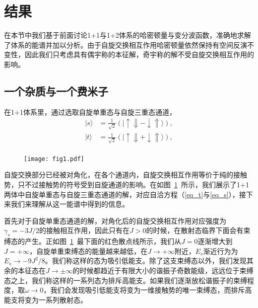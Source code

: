\section{结果}\label{2sec:spex-result}
在本节中我们基于前面讨论1+1与1+2体系的哈密顿量与变分波函数，准确地求解了体系的能谱并加以分析。由于自旋交换相互作用哈密顿量依然保持有空间反演不变性，因此我们只考虑具有偶宇称的本征解，奇宇称的解不受自旋交换相互作用的影响。

\subsection{一个杂质与一个费米子}
在1+1体系里，通过选取自旋单重态与自旋三重态通道，
\begin{equation}
\begin{split}
    |s\rangle &= \frac{1}{\sqrt{2}}(|\uparrow\Downarrow - \downarrow\Uparrow\rangle),\\
    |t\rangle &= \frac{1}{\sqrt{2}}(|\uparrow\Downarrow + \downarrow\Uparrow\rangle),\\
\end{split}
\end{equation}

\begin{figure}[!htbp]
    \centering
    \texttt{[image: fig1.pdf]}
    \label{fig:fig1}
\end{figure}

自旋交换部分已经被对角化，在各个通道内，自旋交换相互作用等价于纯的接触势，只不过接触势的符号受到自旋通道的影响。在如图~\ref{fig:fig1}~所示，我们展示了1+1两体中自旋单重态与自旋三重态通道的解，对应自洽方程（\ref{eq_t}与\ref{eq_s}），接下来我们来理解从这一能谱中得到的信息。



首先对于自旋单重态通道的解，对角化后的自旋交换相互作用对应强度为$\gamma_s=-3J/2$的接触相互作用，因此只有在$J>0$的时候，在散射态临界下面会有束缚态的产生。正如图~\ref{fig:fig1}~最下面的红色散点线所示，我们从$J=0$逐渐增大到$J=+\infty$，自旋单重束缚态的能量越来越低，在$J\to + \infty$附近，$E_s$渐近行为为$E_s\rightarrow -9J^2/8$。我们称这样的态为吸引低能支。除了这支束缚态以外，我们发现其余的本征态在$J\to \pm \infty$的时候都趋近于有限大小的谐振子奇数能级，远远位于束缚态之上，我们称这样的一系列态为排斥高能支。如果我们逐渐放松谐振子的束缚程度，取$\omega\to 0$，我们会发现吸引低能支将变为一维接触势的唯一束缚态，而排斥高能支将变为一系列散射态。

